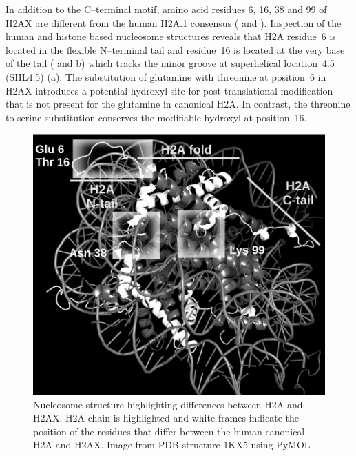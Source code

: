 In addition to the C--terminal motif, amino acid residues 6, 16, 38 and 99 of H2AX are different
from the human H2A.1 consensus ( and ). Inspection
of the human and  histone based nucleosome structures reveals that H2A residue~6 is
located in the flexible N--terminal tail and residue~16 is located at the very base of the tail
( and b) which tracks the minor groove at superhelical
location~4.5 (SHL4.5) (a). The substitution of glutamine with threonine at
position~6 in H2AX introduces a potential hydroxyl site for post-translational modification that is
not present for the glutamine in canonical H2A. In contrast, the threonine to serine substitution
conserves the modifiable hydroxyl at position~16.

\begin{figure}
\includegraphics{h2ax-review/figs/Fig4}
\caption{Nucleosome structure highlighting differences between H2A and H2AX\@. H2A chain is
highlighted and white frames indicate the position of the residues that differ between the human
canonical H2A and H2AX\@. Image from PDB structure 1KX5 using PyMOL \protect\citep{DeL02}.}
\label{fig:h2ax-review:H2AInNucleosome}
\end{figure}

